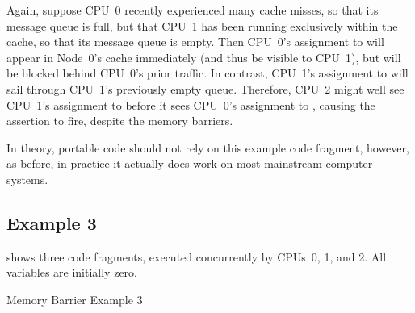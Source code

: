 Again, suppose CPU~0 recently experienced many cache misses, so that its
message queue is full, but that CPU~1 has been running exclusively within
the cache, so that its message queue is empty.
Then CPU~0's assignment to  will appear in Node~0's cache
immediately (and thus be visible to CPU~1), but will be blocked behind
CPU~0's prior traffic.
In contrast, CPU~1's assignment to  will sail through CPU~1's
previously empty queue.
Therefore, CPU~2 might well see CPU~1's assignment to  before
it sees CPU~0's assignment to , causing the assertion to fire,
despite the memory barriers.

In theory, portable code should not rely on this example code fragment,
however, as before, in practice it actually does work on most
mainstream computer systems.

\subsection{Example 3}
\label{sec:app:whymb:Example 3}

shows three code fragments, executed concurrently by CPUs~0, 1, and 2.
All variables are initially zero.

\begin{listing*}
\scriptsize
{}
\caption{Memory Barrier Example 3}
\label{lst:app:whymb:Memory Barrier Example 3}
\end{listing*}


